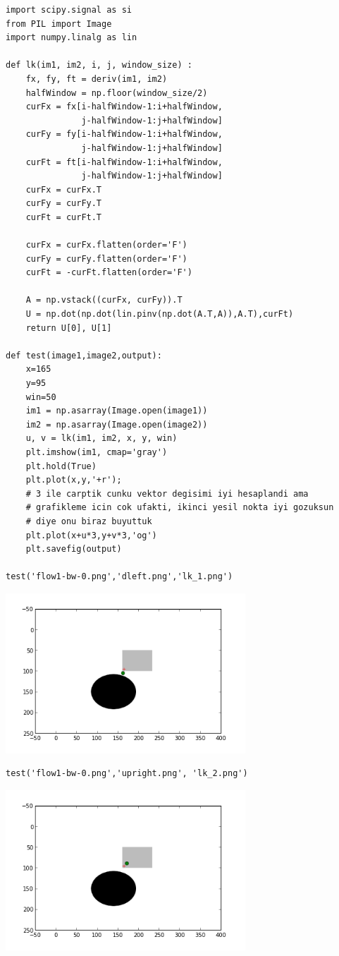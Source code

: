 \documentclass[12pt,fleqn]{article}\usepackage{../common}
\begin{document}
\begin{verbatim}
import scipy.signal as si
from PIL import Image
import numpy.linalg as lin

def lk(im1, im2, i, j, window_size) :
    fx, fy, ft = deriv(im1, im2)
    halfWindow = np.floor(window_size/2)
    curFx = fx[i-halfWindow-1:i+halfWindow, 
               j-halfWindow-1:j+halfWindow]
    curFy = fy[i-halfWindow-1:i+halfWindow, 
               j-halfWindow-1:j+halfWindow]
    curFt = ft[i-halfWindow-1:i+halfWindow, 
               j-halfWindow-1:j+halfWindow]
    curFx = curFx.T
    curFy = curFy.T
    curFt = curFt.T

    curFx = curFx.flatten(order='F') 
    curFy = curFy.flatten(order='F') 
    curFt = -curFt.flatten(order='F') 
    
    A = np.vstack((curFx, curFy)).T
    U = np.dot(np.dot(lin.pinv(np.dot(A.T,A)),A.T),curFt)
    return U[0], U[1]

def test(image1,image2,output): 
    x=165
    y=95
    win=50
    im1 = np.asarray(Image.open(image1))
    im2 = np.asarray(Image.open(image2))
    u, v = lk(im1, im2, x, y, win)
    plt.imshow(im1, cmap='gray')
    plt.hold(True)
    plt.plot(x,y,'+r');
    # 3 ile carptik cunku vektor degisimi iyi hesaplandi ama
    # grafikleme icin cok ufakti, ikinci yesil nokta iyi gozuksun
    # diye onu biraz buyuttuk
    plt.plot(x+u*3,y+v*3,'og')
    plt.savefig(output)

test('flow1-bw-0.png','dleft.png','lk_1.png')
\end{verbatim}

\includegraphics[height=6cm]{lk_1.png}

\begin{verbatim}
test('flow1-bw-0.png','upright.png', 'lk_2.png')
\end{verbatim}

\includegraphics[height=6cm]{lk_2.png}
\end{document}
